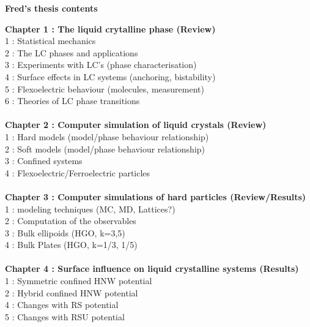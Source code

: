 \documentclass[a4paper]{article}
\newcommand{\mkChap}[1]
	{
	\large\textbf{#1}
	\vspace{2mm}\\
	}
\newcommand{\mkSection}[1]
	{
	\hspace*{25mm}#1\\
	}
\begin{document}
\begin{center}
	\LARGE \textbf{Fred's thesis contents} \\
\end{center}
\vspace{1cm}


%
%
\mkChap{Chapter 1 : The liquid crytalline phase (Review)}
	\mkSection{ 1 :  Statistical mechanics}
	\mkSection{ 2 :  The LC phases and applications}
	\mkSection{ 3 :  Experiments with LC's (phase characterisation)}
	\mkSection{ 4 :  Surface effects in LC systems (anchoring, bistability) }
	\mkSection{ 5 :  Flexoelectric behaviour (molecules, measurement)}
	\mkSection{ 6 :  Theories of LC phase transitions}\\

\mkChap{Chapter 2 : Computer simulation of liquid crystals (Review)}
	\mkSection{ 1 :  Hard models (model/phase behaviour relationship)}
	\mkSection{ 2 :  Soft models (model/phase behaviour relationship)}
	\mkSection{ 3 :  Confined systems}
	\mkSection{ 4 :  Flexoelectric/Ferroelectric particles}\\

\mkChap{Chapter 3 : Computer simulations of hard particles (Review/Results)} 
	\mkSection{ 1 :  modeling techniques (MC, MD, Lattices?)}
	\mkSection{ 2 :  Computation of the observables}
	\mkSection{ 3 :  Bulk ellipoids (HGO, k=3,5)}
	\mkSection{ 4 :  Bulk Plates (HGO, k=1/3, 1/5)}\\
	

\mkChap{Chapter 4 : Surface influence on liquid crystalline systems (Results)} 
	\mkSection{ 1 :  Symmetric confined HNW potential}
	\mkSection{ 2 :  Hybrid confined HNW potential}
	\mkSection{ 4 :  Changes with RS potential}
	\mkSection{ 5 :  Changes with RSU potential}\\
\end{document}
